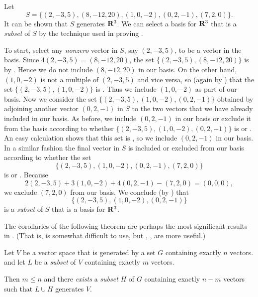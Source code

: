 \begin{example} \label{example 1.6.6}
Let
\[
    S = \{ (2, -3, 5), (8, -12, 20), (1, 0, -2), (0, 2, -1), (7, 2, 0) \}.
\]
It can be shown that \(S\) generates \(\mathbf{R}^3\).
We can select a basis for \(\mathbf{R}^3\) that is a \emph{subset} of \(S\) by the technique used in proving .

To start, select any \emph{nonzero} vector in \(S\), say \((2, -3, 5)\), to be a vector in the basis.
Since \(4(2, -3, 5) = (8 , -12, 20)\), the set \(\{ (2, -3, 5), (8 , -12, 20) \}\) is \LDP{} by .
Hence we do not include \((8, -12, 20)\) in our basis.
On the other hand, \((1, 0, -2)\) is not a multiple of \((2, -3, 5)\) and vice versa, so (again by ) that the set \(\{ (2, -3, 5), (1, 0, -2) \}\) is \LID{}.
Thus we include \((1, 0, -2)\) as part of our basis.
Now we consider the set \(\{ (2, -3, 5), (1, 0, -2), (0, 2, -1) \}\) obtained by adjoining another vector \((0, 2, -1)\) in \(S\) to the two vectors that we have already included in our basis.
As before, we include \((0, 2, -1)\) in our basis or exclude it from the basis according to whether \(\{ (2, -3, 5), (1, 0, -2), (0, 2, -1) \}\) is \LID{} or \LDP{}.
An easy calculation shows that this set is \LID{}, so we include \((0, 2, -1)\) in our basis.
In a similar fashion the final vector in \(S\) is included or excluded from our basis according to whether the set
\[
    \{ (2, -3, 5), (1, 0, -2), (0, 2, -1), (7, 2, 0) \}
\]
is \LID{} or \LDP{}.
Because
\[
    2(2, -3, 5) + 3(1, 0, -2) + 4(0, 2, -1) - (7, 2, 0) = (0, 0, 0),
\]
we exclude \((7, 2, 0)\) from our basis.
We conclude (by ) that
\[
    \{(2, -3, 5), (1, 0, -2), (0, 2, -1)\}
\]
is a \emph{subset} of \(S\) that is a basis for \(\mathbf{R}^3\).
\end{example}

The corollaries of the following theorem are perhaps the most significant results in .
(That is,  is somewhat difficult to use, but , ,  are more useful.)

\begin{theorem}  \label{thm 1.10}
Let \(V\) be a vector space that is generated by a set \(G\) containing exactly \(n\) vectors.
and let \(L\) be a \LID{} \emph{subset} of \(V\) containing exactly \(m\) vectors.

Then  \(m \le n\)  and there \emph{exists} a \emph{subset} \(H\) of \(G\) containing exactly \(n - m\) vectors such that \(L \cup H\) generates \(V\).
\end{theorem}


